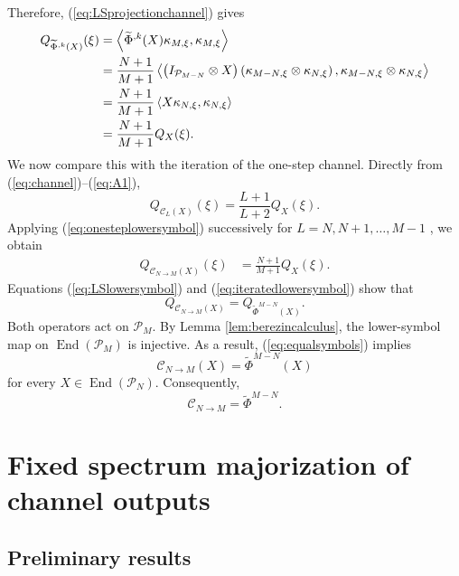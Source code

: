 \documentclass[12pt]{amsart}
\theoremstyle{plain}
\theoremstyle{definition}
\theoremstyle{remark}
\numberwithin{equation}{section}
\newcommand{\func}[1]{\operatorname{#1}}
\newcommand{\1}{\mathbf 1}
\begin{document}
Therefore, (\ref{eq:LSprojectionchannel}) gives 
\begin{align}
Q_{\widetilde{\Phi }^{,k}(X)}(\xi )& =\left\langle \widetilde{\Phi }%
^{,k}(X)\kappa _{M,\xi },\kappa _{M,\xi }\right\rangle   \notag \\
& =\frac{N+1}{M+1}\left\langle \left( I_{\mathcal{P}_{M-N}}\otimes X\right)
\left( \kappa _{M-N,\xi }\otimes \kappa _{N,\xi }\right) ,\kappa _{M-N,\xi
}\otimes \kappa _{N,\xi }\right\rangle   \notag \\
& =\frac{N+1}{M+1}\left\langle X\kappa _{N,\xi },\kappa _{N,\xi
}\right\rangle   \notag \\
& =\frac{N+1}{M+1}Q_{X}(\xi ).  \label{eq:LSlowersymbol}
\end{align}%
We now compare this with the iteration of the one-step channel. Directly
from (\ref{eq:channel})--(\ref{eq:A1}), 
\begin{equation}
Q_{\mathcal{C}_{L}(X)}(\xi )=\frac{L+1}{L+2}Q_{X}(\xi ).
\label{eq:onesteplowersymbol}
\end{equation}%
Applying (\ref{eq:onesteplowersymbol}) successively for $L=N,N+1,\ldots ,M-1$%
, we obtain 
\begin{align}
Q_{\mathcal{C}_{N\rightarrow M}(X)}(\xi )& =\frac{N+1}{M+1}Q_{X}(\xi ).  \label{eq:iteratedlowersymbol}
\end{align}%
Equations (\ref{eq:LSlowersymbol}) and (\ref{eq:iteratedlowersymbol}) show
that 
\begin{equation}
Q_{\mathcal{C}_{N\rightarrow M}(X)}=Q_{\widetilde{\Phi }^{M-N}(X)}.
\label{eq:equalsymbols}
\end{equation}%
Both operators act on $\mathcal{P}_{M}$. By Lemma \ref{lem:berezincalculus},
the lower-symbol map on $\func{End}(\mathcal{P}_{M})$ is injective. As a
result, (\ref{eq:equalsymbols}) implies 
\begin{equation}
\mathcal{C}_{N\rightarrow M}(X)=\widetilde{\Phi }^{M-N}(X)
\end{equation}%
for every $X\in \func{End}(\mathcal{P}_{N})$. Consequently, 
\begin{equation}
\mathcal{C}_{N\rightarrow M}=\widetilde{\Phi }^{M-N}\text{.}
\label{eq:channelLSidentification}
\end{equation}

\section{Fixed spectrum majorization of channel outputs}

\subsection{Preliminary results}
\end{document}
